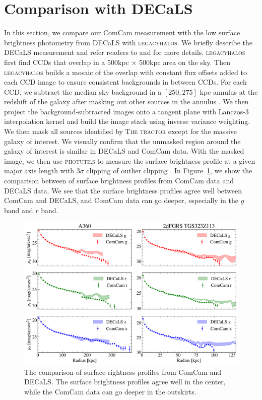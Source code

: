 \documentclass[SE,lsstdraft,authoryear,toc]{lsstdoc}
\newcommand{\lhalos}{\textsc{legacyhalos} }
\begin{document}
\section{Comparison with DECaLS}

In this section, we compare our ComCam measurement with the low surface brightness photometry from DECaLS with \textsc{legacyhalos}. We briefly describe the DECaLS measurement and refer readers to \citet{liReachingEdgeProbing2022} and \citet{moustakasSienaGalaxyAtlas2023} for more details.  \lhalos first find CCDs that overlap in a 500kpc $\times$ 500kpc area on the sky. Then \lhalos builds a mosaic of the overlap with constant flux offsets added to each CCD image to ensure consistent backgrounds in between CCDs. For each CCD, we subtract the median sky background in a $[250, 275]$ kpc annulus at the redshift of the galaxy after masking out other sources in the annulus \citep{liReachingEdgeProbing2022}. We then project the background-subtracted images onto a tangent plane with Lanczos-3 interpolation kernel and build the image stack using inverse variance weighting. We then mask all sources identified by \textsc{The tractor} \citep{langTractorProbabilisticAstronomical2016} except for the massive galaxy of interest. We visually confirm that the unmasked region around the galaxy of interest is similar in DECaLS and ComCam data. With the masked image, we then use \textsc{photutils} to measure the surface brightness profile at a given major axis length with $3\sigma$ clipping of outlier clipping \citep{huangIndividualStellarHaloes2018, liReachingEdgeProbing2022}. In Figure~\ref{fig:comparison}, we show the comparison between of surface brightness profiles from ComCam data and DECaLS data. We see that the surface brightness profiles agree well between ComCam and DECaLS, and ComCam data can go deeper, especially in the $g$ band and $r$ band.


\begin{figure}[!htbp]
  \centering
  \includegraphics[width=1.0\linewidth]{figures/comparison.pdf}
  \caption{The comparison of surface rightness profiles from ComCam and DECaLS. The surface brightness profiles agree well in the center, while the ComCam data can go deeper in the outskirts.}
  \label{fig:comparison}
\end{figure}
\end{document}
